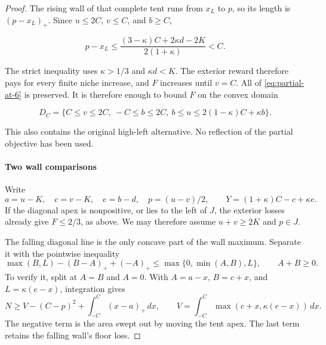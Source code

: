 \begin{proof}
The rising wall of that complete tent runs from \(x_L\) to \(p\),
so its length is \((p-x_L)_+\). Since \(u\le2C\), \(v\le C\),
and \(b\ge C\),

\begin{equation}\label{eq:partial-at-17}
p-x_L\le
\frac{(3-\kappa)C+2\kappa d-2K}{2(1+\kappa)}<C.
\end{equation}

The strict inequality uses \(\kappa>1/3\) and \(\kappa d<K\).
The exterior reward therefore pays for every finite niche increase,
and \(F\) increases until \(v=C\). All of \eqref{eq:partial-at-6} is
preserved. It is therefore enough to bound \(F\) on the convex domain

\begin{equation}\label{eq:partial-at-18}
\boxed{D_C=\{C\le v\le2C,\ -C\le b\le2C,
\ b\le u\le2(1-\kappa)C+\kappa b\}.}
\end{equation}

This also contains the original high-left alternative. No reflection of
the partial objective has been used.

\paragraph{Two wall comparisons}

Write
\[
a=u-K,\quad c=v-K,\quad e=b-d,\quad p=(u-v)/2,\qquad
Y=(1+\kappa)C-c+\kappa e.
\]
If the diagonal apex is nonpositive, or lies to the left of \(J\),
the exterior losses already give \(F\le2/3\), as above. We may
therefore assume \(u+v\ge2K\) and \(p\in J\).

The falling diagonal line is the only concave part of the wall maximum.
Separate it with the pointwise inequality
\begin{equation}\label{eq:initial-wall-separation}
\max(B,L)-(B-A)_++(-A)_+
\le\max\{0,\min(A,B),L\},\qquad A+B\ge0.
\end{equation}
To verify it, split at \(A=B\) and \(A=0\). With
\(A=a-x\), \(B=c+x\), and \(L=\kappa(e-x)\), integration gives
\begin{equation}\label{eq:initial-niche-separation}
N\ge V-(C-p)^2+\int_{-C}^C(x-a)_+\,dx,
\qquad V=\int_{-C}^C\max(c+x,\kappa(e-x))\,dx.
\end{equation}
The negative term is the area swept out by moving the tent apex.
The last term retains the falling wall's floor loss.


\end{proof}
